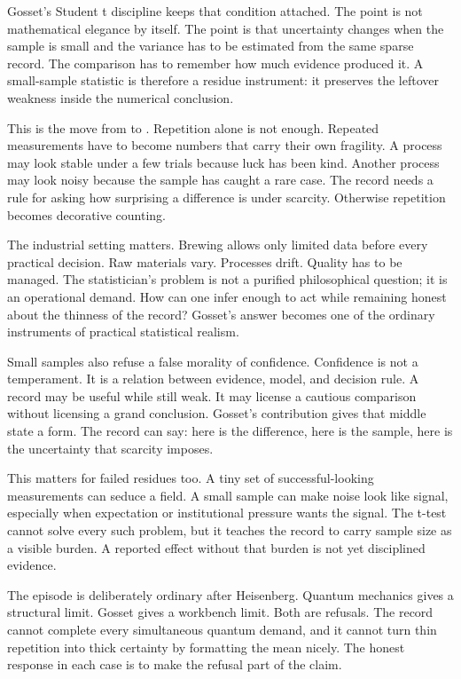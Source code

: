 Gosset's Student t discipline keeps that condition attached. The point is not
mathematical elegance by itself. The point is that uncertainty changes when
the sample is small and the variance has to be estimated from the same
sparse record. The comparison has to remember how much evidence produced it. A
small-sample statistic is therefore a residue instrument: it preserves the
leftover weakness inside the numerical conclusion.

This is the move from  to . Repetition alone is
not enough. Repeated measurements have to become numbers that carry their own
fragility. A process may look stable under a few trials because luck has been
kind. Another process may look noisy because the sample has caught a rare
case. The record needs a rule for asking how surprising a difference is under
scarcity. Otherwise repetition becomes decorative counting.

The industrial setting matters. Brewing allows only limited data before
every practical decision. Raw materials vary. Processes drift. Quality has to
be managed. The statistician's problem is not a purified philosophical
question; it is an operational demand. How can one infer enough to act while
remaining honest about the thinness of the record? Gosset's answer becomes
one of the ordinary instruments of practical statistical realism.

Small samples also refuse a false morality of confidence. Confidence is not a
temperament. It is a relation between evidence, model, and decision rule. A
record may be useful while still weak. It may license a cautious comparison
without licensing a grand conclusion. Gosset's contribution gives that
middle state a form. The record can say: here is the difference, here is the
sample, here is the uncertainty that scarcity imposes.

This matters for failed residues too. A tiny set of successful-looking
measurements can seduce a field. A small sample can make noise look like
signal, especially when expectation or institutional pressure wants the
signal. The t-test cannot solve every such problem, but it teaches the
record to carry sample size as a visible burden. A reported effect without
that burden is not yet disciplined evidence.

The episode is deliberately ordinary after Heisenberg. Quantum mechanics gives
a structural limit. Gosset gives a workbench limit. Both are refusals. The
record cannot complete every simultaneous quantum demand, and it cannot turn
thin repetition into thick certainty by formatting the mean nicely. The
honest response in each case is to make the refusal part of the claim.

